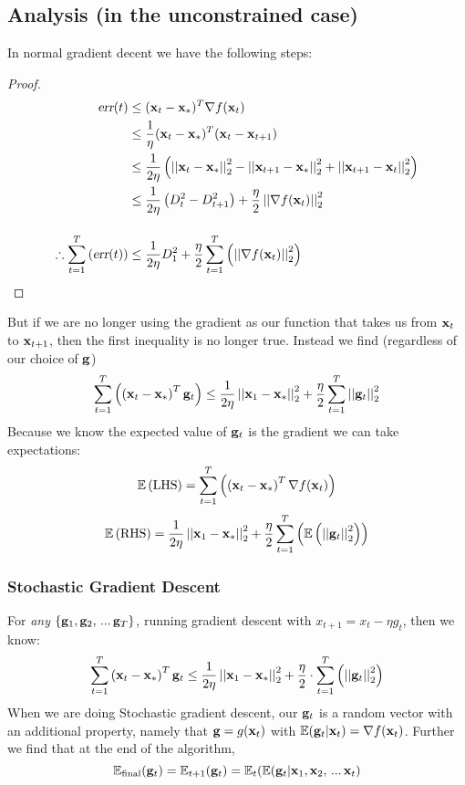 \documentclass[11pt]{article}
\newcommand{\ltnorm} [1] {
  \left| \left| #1 \right| \right|_{2}
}
\begin{document}
\subsection{Analysis (in the unconstrained case)}
In normal gradient decent we have the following steps:
\begin{proof}
\begin{alignat}{2}
\textsl{err} (t) &\leq ({\bf x}_{t} - {\bf x}_{\ast})^{T} \nabla f ({\bf x}_{t}) \notag \\
&\leq \frac{1}{\eta} ({\bf x}_{t} - {\bf x}_{\ast})^{T} ({\bf x}_{t} - {\bf x}_{t + 1}) \notag \\
&\leq \frac{1}{2\eta} \left( \ltnorm{{\bf x}_{t} - {\bf x}_{\ast}}^{2} - \ltnorm{{\bf x}_{t + 1} - {\bf x}_{\ast}}^{2} + \ltnorm{{\bf x}_{t + 1} - {\bf x}_{t}}^{2} \right) \notag \\
&\leq \frac{1}{2\eta} \left( D_{t}^{2} - D_{t + 1}^{2} \right) + \frac{\eta}{2} \ltnorm{\nabla f({\bf x}_{t})}^{2} \notag \\[4mm]
\therefore \sum_{t = 1}^{T} \left( \textsl{err}(t) \right) &\leq \frac{1}{2 \eta} D_{1}^{2} + \frac{\eta}{2} \sum_{t = 1}^{T} \left( \ltnorm{\nabla f({\bf x}_{t})}^{2} \right)
\notag \end{alignat}
\end{proof}
But if we are no longer using the gradient as our function that takes us from ${\bf x}_{t}$ to ${\bf x}_{t + 1}$, then the first inequality is no longer true.  Instead we find (regardless of our choice of ${\bf g}$)
\[ \sum_{t = 1}^{T} \left( \left( {\bf x}_{t} - {\bf x}_{\ast} \right)^{T} {\bf g}_{t} \right)  \leq \frac{1}{2\eta} \ltnorm{{\bf x}_{1} - {\bf x}_{\ast}}^{2} + \frac{\eta}{2} \sum_{t = 1}^{T} \ltnorm{{\bf g}_{t}}^{2} \]
Because we know the expected value of ${\bf g}_{t}$ is the gradient we can take expectations:
\[ \mathbb{E} \left( \text{LHS} \right) = \sum_{t = 1}^{T} \left( \left( {\bf x}_{t} - {\bf x}_{\ast} \right)^{T} \nabla f({\bf x}_{t}) \right) \]
\[ \mathbb{E} \left( \text{RHS} \right) = \frac{1}{2 \eta} \ltnorm{{\bf x}_{1} - {\bf x}_{\ast}}^{2} + \frac{\eta}{2} \sum_{t = 1}^{T} \left( \mathbb{E} \left( \ltnorm{{\bf g}_{t}}^{2} \right) \right) \]

\subsubsection*{Stochastic Gradient Descent}
For \emph{any} $\left\lbrace {\bf g}_{1}, {\bf g}_{2}, \,...\, {\bf g}_{T} \right\rbrace$, running gradient descent with $x_{t + 1} = x_{t} - \eta g_{t}$, then we know:
\[ \sum_{t = 1}^{T} \left( {\bf x}_{t} - {\bf x}_{\ast} \right)^{T} {\bf g}_{t} \leq \frac{1}{2 \eta} \ltnorm{{\bf x}_{1} - {\bf x}_{\ast}}^{2} + \frac{\eta}{2} \cdot \sum_{t = 1}^{T} \left( \ltnorm{{\bf g}_{t}}^{2} \right) \]
When we are doing Stochastic gradient descent, our ${\bf g}_{t}$ is a random vector with an additional property, namely that ${\bf g} = g({\bf x}_{t})$ with $\mathbb{E} ( {\bf g}_{t} | {\bf x}_{t} ) = \nabla f ({\bf x}_{t})$.  Further we find that at the end of the algorithm,
\[ \mathbb{E}_{\text{final}} ({\bf g}_{t}) = \mathbb{E}_{t +1} ({\bf g}_{t}) = \mathbb{E}_{t} ( \mathbb{E} ({\bf g}_{t} | {\bf x}_{1}, {\bf x}_{2}, \,...\, {\bf x}_{t} ) \]
\end{document}
